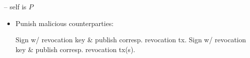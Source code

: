 \begin{center}
\begin{processbox}{\pchan -- self is $P$}
\begin{itemize}
      \item Punish malicious counterparties: 
      \begin{algorithmic}[0]
          \State Sign w/ revocation key \& publish corresp. revocation tx.
        \EndIf
          \State Sign w/ revocation key \& publish corresp. revocation tx(s).
        \EndIf
      \end{algorithmic}
    \end{itemize}
  \end{processbox}
  \label{code:pseudocode}
\end{center}
